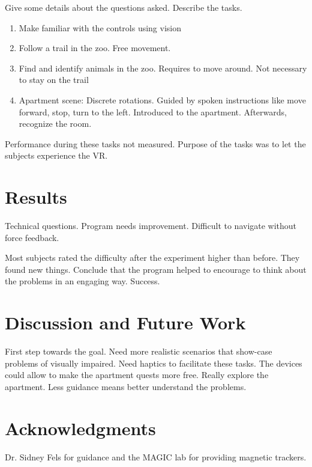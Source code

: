 \documentclass{sig-alternate}
\begin{document}
Give some details about the questions asked. Describe the tasks.
\begin{enumerate}
  \item Make familiar with the controls using vision
  \item Follow a trail in the zoo. Free movement.
  \item Find and identify animals in the zoo. Requires to move around. Not
  necessary to stay on the trail
  \item Apartment scene: Discrete rotations. Guided by spoken instructions like
  move forward, stop, turn to the left. Introduced to the apartment. Afterwards,
  recognize the room.
\end{enumerate}
Performance during these tasks not measured. Purpose of the tasks was to let the
subjects experience the VR.

\section{Results}

Technical questions. Program needs improvement. Difficult to navigate without
force feedback.

Most subjects rated the difficulty after the experiment higher than before. They
found new things. Conclude that the program helped to encourage to think about
the problems in an engaging way. Success.

\section{Discussion and Future Work}

First step towards the goal. Need more realistic scenarios that show-case
problems of visually impaired. Need haptics to facilitate these tasks. The
devices could allow to make the apartment quests more free. Really explore the
apartment. Less guidance means better understand the problems.

\section{Acknowledgments}
Dr. Sidney Fels for guidance and the MAGIC lab for providing magnetic trackers.

%

\end{document}

